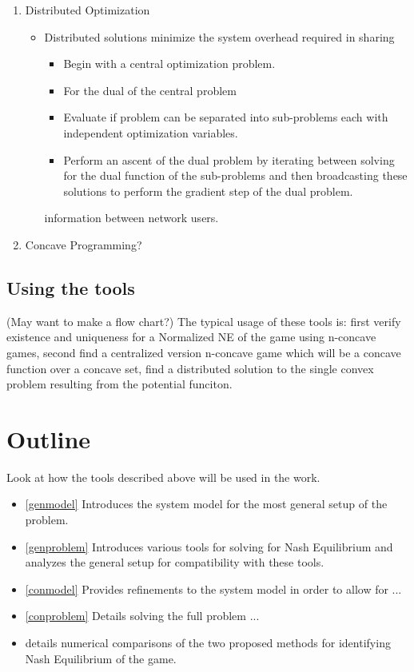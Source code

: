 \documentclass[12pt,a4paper]{report}
\begin{document}
\begin{enumerate}
\item Distributed Optimization
\begin{itemize}
\item Distributed solutions minimize the system overhead required in sharing
\begin{itemize}
\item Begin with a central optimization problem.
\item For the dual of the central problem
\item Evaluate if problem can be separated into sub-problems each with independent optimization variables.
\item Perform an ascent of the dual problem by iterating between solving for the dual function of the sub-problems and then broadcasting these solutions to perform the gradient step of the dual problem. 

\end{itemize} information between network users. 
\end{itemize}
\item Concave Programming?

\end{enumerate}
\subsection{Using the tools}
(May want to make a flow chart?)
The typical usage of these tools is:
first verify existence and uniqueness for a Normalized NE of the game using n-concave games,
second find a centralized version n-concave game which will be a concave function over a concave set,
find a distributed solution to the single convex problem resulting from the potential funciton.


\section{Outline}
Look at how the tools described above will be used in the work. 
\begin{itemize}
\item 
\ref{genmodel} Introduces the system model for the most general setup of the problem.
\item 
\ref{genproblem} Introduces various tools for solving for Nash Equilibrium and analyzes the general setup for compatibility with these tools. 
\item
\ref{conmodel} Provides refinements to the system model in order to allow for ...
\item 
\ref{conproblem} Details solving the full problem ...
\item 
details numerical comparisons of the two proposed methods for identifying Nash Equilibrium of the game. 
\end{itemize}
\end{document}
